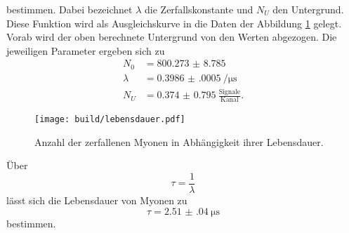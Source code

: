 bestimmen. Dabei bezeichnet $\lambda$ die Zerfallskonstante und $N_U$ den Untergrund. Diese Funktion wird als Ausgleichskurve in die Daten der Abbildung \ref{fig:leben} gelegt. Vorab wird der oben berechnete Untergrund von den Werten abgezogen. Die jeweiligen Parameter ergeben sich zu
\begin{align*}
    N_0 &= \num{800.273(8785)} \\
    \lambda &=  \SI{0.3986(0005)}{\per\micro\s} \\
    N_U &= \num{0.374(0795)} \: \frac{\text{Signale}}{\text{Kanal}} .
\end{align*}

\begin{figure}
    \centering
    \texttt{[image: build/lebensdauer.pdf]}
    \caption{Anzahl der zerfallenen Myonen in Abhängigkeit ihrer Lebensdauer.}
    \label{fig:leben}
\end{figure}

Über 
\begin{equation}
\tau = \frac{1}{\lambda}     
\end{equation}
lässt sich die Lebensdauer von Myonen zu
\begin{equation}
    \tau = \SI{ 2.51(04)}{\micro\s}
\end{equation}
bestimmen.


%
